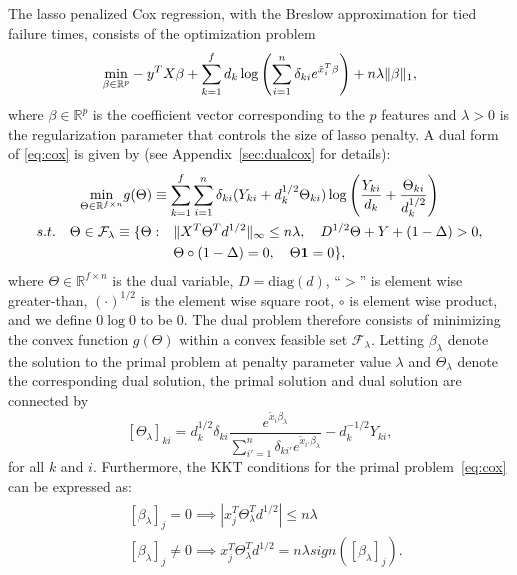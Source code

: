 The lasso penalized Cox regression, with the Breslow approximation \citep{breslow1974covariance} for tied failure times, consists of the optimization problem
\begin{equation}
    \label{eq:cox}
    \underset{\beta\in \mathbb{R}^p}{\mathrm{min}}-y^TX\beta+\sum_{k=1}^f d_k\log\left(\sum_{i=1}^n \delta_{ki} e^{\tilde{x}_i^T\beta}\right)+n\lambda\lVert\beta\rVert_1,
\end{equation}
where $\beta\in\mathbb{R}^p$ is the coefficient vector corresponding to the $p$ features and $\lambda>0$ is the regularization parameter that controls the size of lasso penalty. A dual form of \eqref{eq:cox} is given by (see Appendix~\ref{sec:dualcox} for details):
\begin{gather}
        \label{eq:dualTheta}
        \underset{\Theta\in \mathbb{R}^{f\times n}}{\mathrm{min}}g(\Theta)\equiv\sum_{k=1}^f\sum_{i=1}^n\delta_{ki}(Y_{ki}+d_k^{1/2}\Theta_{ki})\log\left(\frac{Y_{ki}}{d_k}+\frac{\Theta_{ki}}{d_k^{1/2}}\right)\\
        \begin{aligned}s.t.\quad \Theta\in \mathcal{F}_\lambda\equiv\{\Theta:\quad
            &\lVert X^T\Theta^Td^{1/2}\rVert_\infty\leq n\lambda,\quad D^{1/2}\Theta+Y+(1-\Delta)> 0,\\& \Theta\circ(1-\Delta)=0,\quad \Theta\mathbf{1}=0\}\nonumber,
        \end{aligned}
\end{gather}
where $\Theta\in \mathbb{R}^{f\times n}$ is the dual variable, $D=\textrm{diag}(d)$, ``$>$'' is element wise greater-than, $(\cdot)^{1/2}$ is the element wise square root, $\circ$ is element wise product, and we define $0\log 0$ to be 0. The dual problem therefore consists of minimizing the convex function $g(\Theta)$ within a convex feasible set $\mathcal{F}_\lambda$. Letting $\beta_\lambda$ denote the solution to the primal problem at penalty parameter value $\lambda$ and $\Theta_{\lambda}$ denote the corresponding dual solution, the primal solution and dual solution are connected by
\begin{equation}
    \label{eq:dualprimalcox}
    [\Theta_\lambda]_{ki}=d_k^{1/2}\delta_{ki}\frac{e^{\tilde{x}_i\beta_\lambda}}{\sum_{i'=1}^n\delta_{ki'}e^{\tilde{x}_{i'}\beta_\lambda}}-d_k^{-1/2}Y_{ki},
\end{equation}
for all $k$ and $i$. Furthermore, the KKT conditions for the primal problem~\eqref{eq:cox} can be expressed as:
\begin{gather}
    \label{eq:kktcox}
    \begin{aligned}&[\beta_\lambda]_{j}=0\implies\left|x_j^T\Theta_\lambda^Td^{1/2}\right|\leq n\lambda\\
    & [\beta_\lambda]_{j}\neq0\implies x_j^T\Theta_\lambda^Td^{1/2}= n\lambda\textit{sign}([\beta_\lambda]_{j}).
    \end{aligned}
\end{gather}
